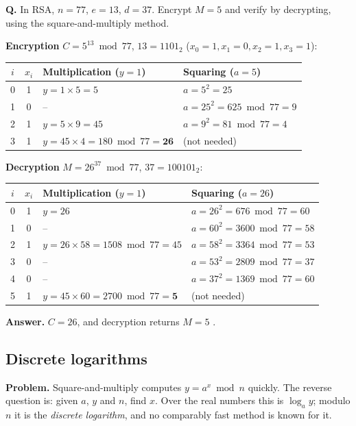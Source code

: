 \begin{worked}
\textbf{Q.} In RSA, $n = 77$, $e = 13$, $d = 37$. Encrypt $M = 5$ and verify by decrypting, using the square-and-multiply method.

\textbf{Encryption} $C = 5^{13} \bmod 77$, $13 = 1101_2$ ($x_0 = 1, x_1 = 0, x_2 = 1, x_3 = 1$):
\begin{center}\small
\begin{tabular}{@{}ccll@{}}
\toprule
$i$ & $x_i$ & Multiplication ($y = 1$) & Squaring ($a = 5$)\\
\midrule
0 & 1 & $y = 1 \times 5 = 5$ & $a = 5^2 = 25$\\
1 & 0 & -- & $a = 25^2 = 625 \bmod 77 = 9$\\
2 & 1 & $y = 5 \times 9 = 45$ & $a = 9^2 = 81 \bmod 77 = 4$\\
3 & 1 & $y = 45 \times 4 = 180 \bmod 77 = \mathbf{26}$ & (not needed)\\
\bottomrule
\end{tabular}
\end{center}
\textbf{Decryption} $M = 26^{37} \bmod 77$, $37 = 100101_2$:
\begin{center}\small
\begin{tabular}{@{}ccll@{}}
\toprule
$i$ & $x_i$ & Multiplication ($y = 1$) & Squaring ($a = 26$)\\
\midrule
0 & 1 & $y = 26$ & $a = 26^2 = 676 \bmod 77 = 60$\\
1 & 0 & -- & $a = 60^2 = 3600 \bmod 77 = 58$\\
2 & 1 & $y = 26 \times 58 = 1508 \bmod 77 = 45$ & $a = 58^2 = 3364 \bmod 77 = 53$\\
3 & 0 & -- & $a = 53^2 = 2809 \bmod 77 = 37$\\
4 & 0 & -- & $a = 37^2 = 1369 \bmod 77 = 60$\\
5 & 1 & $y = 45 \times 60 = 2700 \bmod 77 = \mathbf{5}$ & (not needed)\\
\bottomrule
\end{tabular}
\end{center}
\textbf{Answer.} $C = 26$, and decryption returns $M = 5$ \checkmark.
\end{worked}

\subsection{Discrete logarithms \new}
\textbf{Problem.} Square-and-multiply computes $y = a^x \bmod n$ quickly. The reverse question is: given $a$, $y$ and $n$, find $x$. Over the real numbers this is $\log_a y$; modulo $n$ it is the \emph{discrete logarithm}, and no comparably fast method is known for it.

